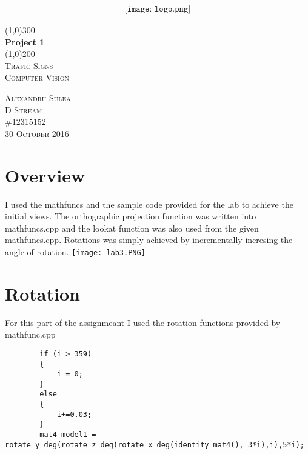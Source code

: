 \documentclass{article}
\begin{document}
\begin{titlepage}
	\begin{center}
	\begin{align*}
	\texttt{[image: logo.png]}
	\end{align*}


	
	\line(1,0){300}\\
	[0.25in]
	\huge{\bfseries Project 1 }\\
	[2mm]
	\line(1,0){200}\\
	[1.5cm]
	\textsc{\LARGE Trafic Signs}\\
	[0.75cm]
	\textsc{\Large Computer Vision}\\
	[7cm]	
	\end{center}
	
	\begin{flushright}
	\textsc{\large Alexandru Sulea\\
	D Stream\\
	\#12315152\\
	30 October 2016\\}
	\end{flushright}
	
\end{titlepage}


\thispagestyle{empty}
\cleardoublepage
{}
\setcounter{page}{1}

\pagebreak
\section{Overview}
I used the mathfuncs and the sample code provided for the lab to achieve the initial views. The orthographic projection function was written into mathfuncs.cpp and the lookat function was also used from the given mathfuncs.cpp. 
Rotations was simply achieved by incrementally incresing the angle of rotation.
\texttt{[image: lab3.PNG]}


\section{Rotation}
For this part of the assignmeant I used the rotation functions provided by mathfunc.cpp
\begin{lstlisting}
		if (i > 359)
		{
			i = 0;
		}
		else
		{
			i+=0.03;
		}
		mat4 model1 = rotate_y_deg(rotate_z_deg(rotate_x_deg(identity_mat4(), 3*i),i),5*i);
\end{lstlisting}
\end{document}
